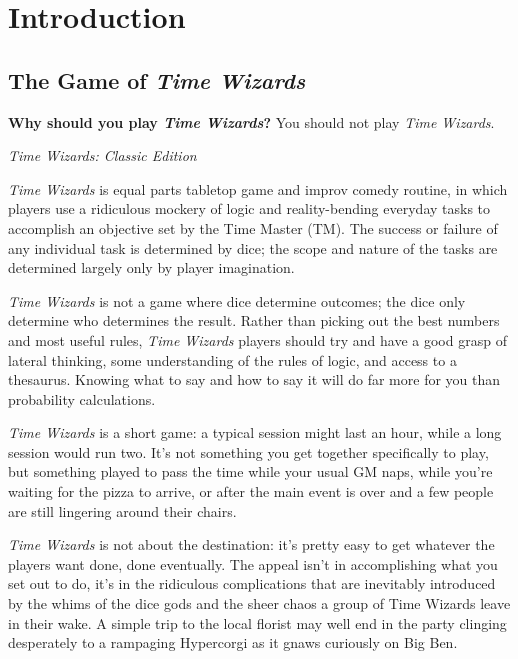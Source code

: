 \documentclass[twoside]{article}
\newcommand{\tw}{\emph{Time Wizards}}
\begin{document}
\setcounter{page}{-3}


\pagestyle{empty}
\cleardoublepage

\setcounter{tocdepth}{2}
\tableofcontents
\cleardoublepage

\pagestyle{plain}

\section{Introduction} \label{sec:intro}
\subsection{The Game of \tw{}} \label{ssec:gameintro}
\epigraph{\textbf{Why should you play \tw{}?} You should not play \tw{}.}
   {\emph{Time Wizards: Classic Edition}}
\tw{} is equal parts tabletop game and improv comedy routine, in which players use a ridiculous
mockery of logic and reality-bending everyday tasks to accomplish an objective set by the Time
Master (TM). The success or failure of any individual task is determined by dice; the scope and
nature of the tasks are determined largely only by player imagination.

\tw{} is not a game where dice determine outcomes; the dice only determine who determines the
result. Rather than picking out the best numbers and most useful rules, \tw{} players should
try and have a good grasp of lateral thinking, some understanding of the rules of logic, and
access to a thesaurus. Knowing what to say and how to say it will do far more for you than
probability calculations.

\tw{} is a short game: a typical session might last an hour, while a long session would run two.
It's not something you get together specifically to play, but something played to pass the time
while your usual GM naps, while you're waiting for the pizza to arrive, or after the main event
is over and a few people are still lingering around their chairs.

\tw{} is not about the destination: it's pretty easy to get whatever the players want done, done
eventually. The appeal isn't in accomplishing what you set out to do, it's in the ridiculous
complications that are inevitably introduced by the whims of the dice gods and the sheer chaos
a group of Time Wizards leave in their wake. A simple trip to the local florist may well end in
the party clinging desperately to a rampaging Hypercorgi as it gnaws curiously on Big Ben.
\end{document}
